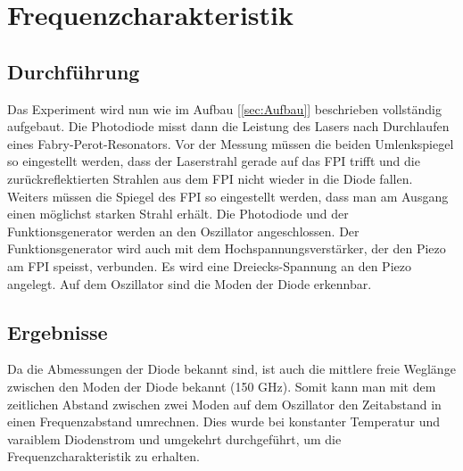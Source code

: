 \documentclass[a4paper,10pt]{scrartcl} %
\begin{document}
\section{Frequenzcharakteristik}
\label{sec:Frequenzchar}

\subsection{Durchführung}
\label{subsec:Frequenz_Durchfuehrung}
Das Experiment wird nun wie im Aufbau [\ref{sec:Aufbau}] beschrieben vollständig aufgebaut. Die Photodiode misst dann die Leistung des Lasers nach Durchlaufen eines Fabry-Perot-Resonators. Vor der Messung müssen die beiden Umlenkspiegel so eingestellt werden, dass der Laserstrahl gerade auf das FPI trifft und die zurückreflektierten Strahlen aus dem FPI nicht wieder in die Diode fallen. Weiters müssen die Spiegel des FPI so eingestellt werden, dass man am Ausgang einen möglichst starken Strahl erhält. Die Photodiode und der Funktionsgenerator werden an den Oszillator angeschlossen. Der Funktionsgenerator wird auch mit dem Hochspannungsverstärker, der den Piezo am FPI speisst, verbunden. Es wird eine Dreiecks-Spannung an den Piezo angelegt. Auf dem Oszillator sind die Moden der Diode erkennbar.
\subsection{Ergebnisse}
\label{subsec:Freq_Ergebnisse }
Da die Abmessungen der Diode bekannt sind, ist auch die mittlere freie Weglänge zwischen den Moden der Diode bekannt (150 GHz). Somit kann man mit dem zeitlichen Abstand zwischen zwei Moden auf dem Oszillator den Zeitabstand in einen Frequenzabstand umrechnen. Dies wurde bei konstanter Temperatur und varaiblem Diodenstrom und umgekehrt durchgeführt, um die Frequenzcharakteristik zu erhalten.
\end{document}
